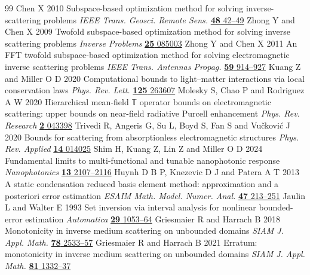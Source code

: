 \begin{thebibliography}{99}
 Chen X 2010 Subspace-based optimization method for solving inverse-scattering problems \emph{IEEE Trans. Geosci. Remote Sens.} \href{https://doi.org/10.1109/TGRS.2009.2025122}{\textbf{48} 42--49}
 Zhong Y and Chen X 2009 Twofold subspace-based optimization method for solving inverse scattering problems \emph{Inverse Problems} \href{https://doi.org/10.1088/0266-5611/25/8/085003}{\textbf{25} 085003}
 Zhong Y and Chen X 2011 An FFT twofold subspace-based optimization method for solving electromagnetic inverse scattering problems \emph{IEEE Trans. Antennas Propag.} \href{https://doi.org/10.1109/TAP.2010.2103027}{\textbf{59} 914--927}
 Kuang Z and Miller O D 2020 Computational bounds to light--matter interactions via local conservation laws \emph{Phys. Rev. Lett.} \href{https://doi.org/10.1103/PhysRevLett.125.263607}{\textbf{125} 263607}
 Molesky S, Chao P and Rodriguez A W 2020 Hierarchical mean-field $\mathbb{T}$ operator bounds on electromagnetic scattering: upper bounds on near-field radiative Purcell enhancement \emph{Phys. Rev. Research} \href{https://doi.org/10.1103/PhysRevResearch.2.043398}{\textbf{2} 043398}
 Trivedi R, Angeris G, Su L, Boyd S, Fan S and Vu\v{c}kovi\'{c} J 2020 Bounds for scattering from absorptionless electromagnetic structures \emph{Phys. Rev. Applied} \href{https://doi.org/10.1103/PhysRevApplied.14.014025}{\textbf{14} 014025}
 Shim H, Kuang Z, Lin Z and Miller O D 2024 Fundamental limits to multi-functional and tunable nanophotonic response \emph{Nanophotonics} \href{https://doi.org/10.1515/nanoph-2023-0630}{\textbf{13} 2107--2116}
 Huynh D B P, Knezevic D J and Patera A T 2013 A static condensation reduced basis element method: approximation and a posteriori error estimation \emph{ESAIM Math. Model. Numer. Anal.} \href{https://doi.org/10.1051/m2an/2012022}{\textbf{47} 213--251}
Jaulin L and Walter E 1993 Set inversion via interval analysis for nonlinear bounded-error estimation \emph{Automatica} \href{https://doi.org/10.1016/0005-1098(93)90106-4}{\textbf{29} 1053--64}
Griesmaier R and Harrach B 2018 Monotonicity in inverse medium scattering on unbounded domains \emph{SIAM J. Appl. Math.} \href{https://doi.org/10.1137/18M1171679}{\textbf{78} 2533--57}
Griesmaier R and Harrach B 2021 Erratum: monotonicity in inverse medium scattering on unbounded domains \emph{SIAM J. Appl. Math.} \href{https://doi.org/10.1137/21M1399221}{\textbf{81} 1332--37}

\end{thebibliography}
